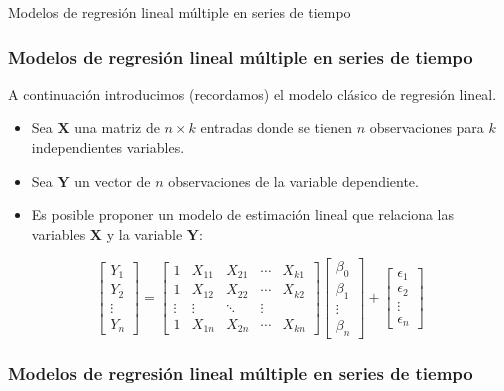 \documentclass[xcolor=(list of options)]{beamer}
\begin{document}
\begin{section}{Modelos de regresi\'on lineal m\'ultiple en series de tiempo}
\begin{frame}
\frametitle{Modelos de regresi\'on lineal m\'ultiple en series de tiempo}
A continuaci\'on introducimos (recordamos) el modelo cl\'asico de regresi\'on lineal.
\begin{itemize}
\item Sea $\mathbf{X}$ una matriz de $n\times k$ entradas donde se tienen
$n$ observaciones para $k$ independientes variables.
\item Sea $\mathbf{Y}$ un vector de $n$ observaciones de la variable dependiente.
\item Es posible proponer un modelo de estimaci\'on lineal que relaciona las
variables $\mathbf{X}$ y la variable $\mathbf{Y}$:
\end{itemize}

\[
\begin{bmatrix}Y_{1}\\
Y_{2}\\
\vdots\\
Y_{n}
\end{bmatrix}=\begin{bmatrix} 1 & X_{11} & X_{21} & \cdots & X_{k1}\\
1 & X_{12} & X_{22} & \cdots & X_{k2}\\
\vdots & \vdots & \ddots & \vdots\\
1 & X_{1n} & X_{2n} & \cdots & X_{kn}
\end{bmatrix}\begin{bmatrix}\beta_{0}\\
\beta_{1}\\
\vdots\\
\beta_{n}
\end{bmatrix}+\begin{bmatrix}\epsilon_{1}\\
\epsilon_{2}\\
\vdots\\
\epsilon_{n}
\end{bmatrix}
\]

\end{frame}
\begin{frame}
\frametitle{Modelos de regresi\'on lineal m\'ultiple en series de tiempo}


\end{frame}
\end{section}
\end{document}
